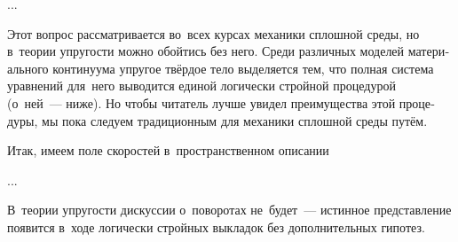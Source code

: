 \begin{otherlanguage}{russian}
...





Этот вопрос рассматривается во~всех курсах механики сплошной среды, но в~теории упругости можно обойтись без него. Среди различных моделей материального континуума упругое твёрдое тело выделяется тем, что полная система уравнений для~него выводится единой логически стройной процедурой (о~ней~--- ниже). Но чтобы читатель лучше увидел преимущества этой процедуры, мы пока следуем традиционным для механики сплошной среды путём.

Итак, имеем поле скоростей в~пространственном описании


...



В~теории упругости дискуссии о~поворотах не~будет~--- истинное представление появится в~ходе логически стройных выкладок без дополнительных гипотез.

\end{otherlanguage}

\newpage






